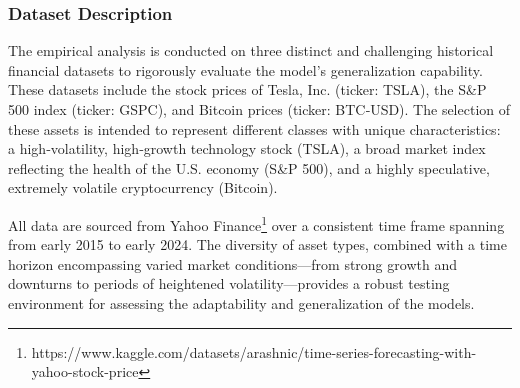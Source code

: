 \documentclass{cys}
\begin{document}
\begin{enumerate}

\subsubsection{Dataset Description}
The empirical analysis is conducted on three distinct and challenging historical financial datasets to rigorously evaluate the model’s generalization capability. These datasets include the stock prices of Tesla, Inc. (ticker: TSLA), the S\&P 500 index (ticker: GSPC), and Bitcoin prices (ticker: BTC‑USD). The selection of these assets is intended to represent different classes with unique characteristics: a high‑volatility, high‑growth technology stock (TSLA), a broad market index reflecting the health of the U.S. economy (S\&P 500), and a highly speculative, extremely volatile cryptocurrency (Bitcoin).

All data are sourced from Yahoo Finance\footnote{https://www.kaggle.com/datasets/arashnic/time-series-forecasting-with-yahoo-stock-price} over a consistent time frame spanning from early 2015 to early 2024. The diversity of asset types, combined with a time horizon encompassing varied market conditions—from strong growth and downturns to periods of heightened volatility—provides a robust testing environment for assessing the adaptability and generalization of the models.


\end{enumerate}
\end{document}
